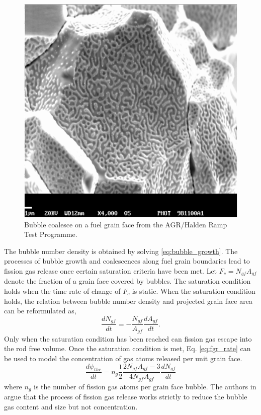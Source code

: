 \begin{figure}
\caption{\label{fig:bubble_coalesce}
Bubble coalesce on a fuel grain face from the AGR/Halden Ramp Test Programme\cite{White}.}
 \begin{center}
  \includegraphics[scale=1.]{./Slides/fgr_1.png}
 \end{center}
\end{figure}
The bubble number density is obtained by solving \ref{eq:bubble_growth}. The processes of bubble growth and coalescences along fuel grain boundaries lead to fission gas release once certain saturation criteria have been met. Let $F_c = N_{gf}A_{gf}$ denote the fraction of a grain face covered by bubbles. The saturation condition holds when the time rate of change of $F_c$ is static. When the saturation condition holds, the relation between bubble number density and projected grain face area can be reformulated as,
\begin{equation}
\label{eq:bubble_coalesecence_sat}
 \frac{dN_{gf}}{dt} = -\frac{N_{gf}}{A_{gf}} \frac{dA_{gf}}{dt}.
\end{equation}
Only when the saturation condition has been reached can fission gas escape into the rod free volume. Once the saturation condition is met, Eq. \ref{eq:fgr_rate} can be used to model the concentration of gas atoms released per unit grain face. 
\begin{equation}
\label{eq:fgr_rate}
 \frac{d\psi_{thr}}{dt} = n_g \frac{1}{2} \frac{2N_{gf}A_{gf} - 3}{4N_{gf}A_{gf}} \frac{dN_{gf}}{dt}
\end{equation}      
where $n_g$ is the number of fission gas atoms per grain face bubble. The authors in \cite{Pastore3} argue that the process of fission gas release works strictly to reduce the bubble gas content and size but not concentration. 


